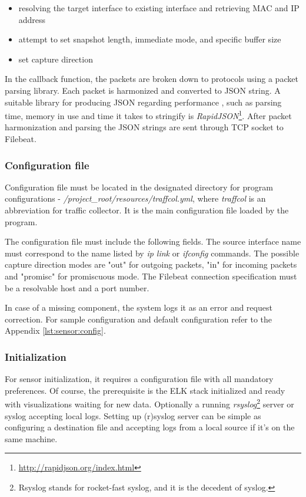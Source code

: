 \documentclass[12pt,a4paper,twoside]{book}
\begin{document}
                \begin{itemize}[noitemsep]
                    \item resolving the target interface to existing interface and retrieving MAC and IP address
                    \item attempt to set snapshot length, immediate mode, and specific buffer size
                    \item set capture direction
                \end{itemize}\par
                In the callback function, the packets are broken down to protocols using a packet parsing library. Each packet is harmonized and converted to JSON string. A suitable library for producing JSON regarding performance \cite{git:benchmark:json}, such as parsing time, memory in use and time it takes to stringify is \emph{RapidJSON}\footnote{\url{http://rapidjson.org/index.html}}. After packet harmonization and parsing the JSON strings are sent through TCP socket to Filebeat.
            \subsubsection*{Configuration file} \label{implementation:sensor:config}
                Configuration file must be located in the designated directory for program configurations - \emph{/project\_root/resources/traffcol.yml}, where \emph{traffcol} is an abbreviation for traffic collector. It is the main configuration file loaded by the program.\par
                The configuration file must include the following fields. The source interface name must correspond to the name listed by \emph{ip link} or \emph{ifconfig} commands. The possible capture direction modes are "out" for outgoing packets, "in" for incoming packets and "promisc" for promiscuous mode. The Filebeat connection specification must be a resolvable host and a port number.\par
                In case of a missing component, the system logs it as an error and request correction. For sample configuration and default configuration refer to the Appendix \autoref{lst:sensor:config}.
            \subsubsection*{Initialization}
            For sensor initialization, it requires a configuration file with all mandatory preferences. Of course, the prerequisite is the ELK stack initialized and ready with visualizations waiting for new data. Optionally a running \emph{rsyslog}\footnote{Rsyslog stands for rocket-fast syslog, and it is the decedent of syslog.} server or syslog accepting local logs. Setting up (r)syslog server can be simple as configuring a destination file and accepting logs from a local source if it's on the same machine.
            
\end{document}
